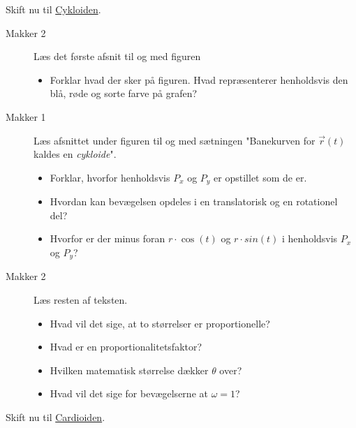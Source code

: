 \documentclass[a4paper, 12pt]{article}
\begin{document}
Skift nu til \href{https://matahtx.systime.dk/?id=p366}{Cykloiden}.

\begin{description}
\item[{Makker 2}] Læs det første afsnit til og med figuren 
\begin{itemize}
\item Forklar hvad der sker på figuren. Hvad repræsenterer henholdsvis den blå, røde og sorte farve på grafen?
\end{itemize}

\item[{Makker 1}] Læs afsnittet under figuren til og med sætningen "Banekurven for \(\vec{r}(t)\) kaldes en \emph{cykloide}".
\begin{itemize}
\item Forklar, hvorfor henholdsvis \(P_x\) og \(P_y\) er opstillet som de er.
\item Hvordan kan bevægelsen opdeles i en translatorisk og en rotationel del?
\item Hvorfor er der minus foran \(r\cdot\cos (t)\) og \(r \cdot sin(t)\) i henholdsvis \(P_x\) og \(P_y\)?
\end{itemize}

\item[{Makker 2}] Læs resten af teksten.
\begin{itemize}
\item Hvad vil det sige, at to størrelser er proportionelle?
\item Hvad er en proportionalitetsfaktor?
\item Hvilken matematisk størrelse dækker \(\theta\) over?
\item Hvad vil det sige for bevægelserne at \(\omega = 1\)?
\end{itemize}
\end{description}

Skift nu til \href{https://matahtx.systime.dk/?id=p367}{Cardioiden}.
\end{document}
